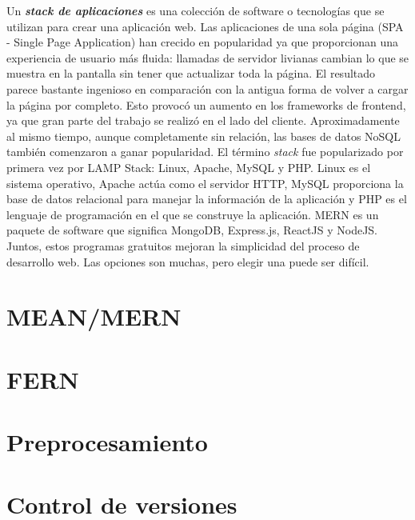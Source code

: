 Un \textbf{\textit{stack de aplicaciones}} es una colección de software o tecnologías que se utilizan para crear una aplicación web. Las aplicaciones de una sola página (SPA - Single Page Application) han crecido en popularidad ya que proporcionan una experiencia de usuario más fluida: llamadas de servidor livianas cambian lo que se muestra en la pantalla sin tener que actualizar toda la página. El resultado parece bastante ingenioso en comparación con la antigua forma de volver a cargar la página por completo. Esto provocó un aumento en los \glspl{framework} de \gls{frontend}, ya que gran parte del trabajo se realizó en el lado del cliente. Aproximadamente al mismo tiempo, aunque completamente sin relación, las bases de datos NoSQL también comenzaron a ganar popularidad. El término \textit{stack} fue popularizado por primera vez por LAMP Stack: Linux, Apache, MySQL y PHP. Linux es el sistema operativo, Apache actúa como el servidor HTTP, MySQL proporciona la base de datos relacional para manejar la información de la aplicación y PHP es el lenguaje de programación en el que se construye la aplicación. MERN es un paquete de software que significa MongoDB, Express.js, ReactJS y NodeJS. Juntos, estos programas gratuitos mejoran la simplicidad del proceso de desarrollo web. Las opciones son muchas, pero elegir una puede ser difícil.

% 

\section{MEAN/MERN}


\newpage
\section{FERN}


\newpage
\section{Preprocesamiento}


\newpage
\section{Control de versiones}
